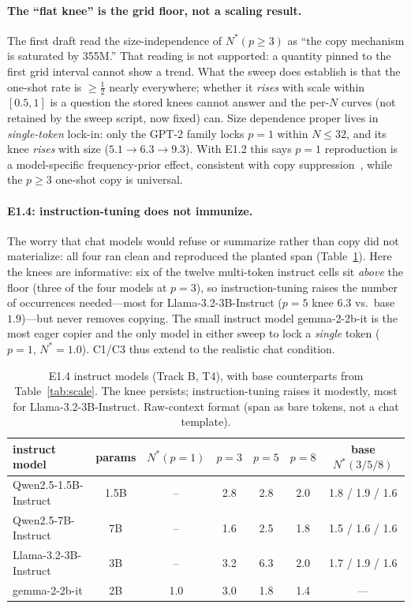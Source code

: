 \documentclass[11pt]{article}
\theoremstyle{plain}
\theoremstyle{definition}
\theoremstyle{remark}
\begin{document}
\paragraph{The ``flat knee'' is the grid floor, not a scaling result.} The first draft read the
size-independence of $N^*(p\ge3)$ as ``the copy mechanism is saturated by 355M.'' That reading
is not supported: a quantity pinned to the first grid interval cannot show a trend. What the
sweep does establish is that the one-shot rate is $\ge\tfrac12$ nearly everywhere; whether it
\emph{rises} with scale within $[0.5,1]$ is a question the stored knees cannot answer and the
per-$N$ curves (not retained by the sweep script, now fixed) can. Size dependence proper lives in
\emph{single-token} lock-in: only the GPT-2 family locks $p{=}1$ within $N\le32$, and its knee
\emph{rises} with size ($5.1\to6.3\to9.3$). With E1.2 this says $p{=}1$ reproduction is a
model-specific frequency-prior effect, consistent with copy suppression~\cite{mcdougall2023},
while the $p\ge3$ one-shot copy is universal.

\paragraph{E1.4: instruction-tuning does not immunize.} The worry that chat models would
refuse or summarize rather than copy did not materialize: all four ran clean and reproduced
the planted span (Table~\ref{tab:instruct}). Here the knees are informative: six of the twelve
multi-token instruct cells sit \emph{above} the floor (three of the four models at $p{=}3$),
so instruction-tuning raises the number of occurrences needed---most for Llama-3.2-3B-Instruct
($p{=}5$ knee $6.3$ vs.\ base $1.9$)---but never removes copying.
The small instruct model gemma-2-2b-it is the most eager copier and the only model in either
sweep to lock a \emph{single} token ($p{=}1$, $N^*{=}1.0$). C1/C3 thus extend to the realistic
chat condition.

\begin{table}[h]
\centering\small
\begin{tabular}{lcccccc}
\toprule
instruct model & params & $N^*(p{=}1)$ & $p{=}3$ & $p{=}5$ & $p{=}8$ & base $N^*(3/5/8)$ \\
\midrule
Qwen2.5-1.5B-Instruct & 1.5B & --  & 2.8 & 2.8 & 2.0 & 1.8 / 1.9 / 1.6 \\
Qwen2.5-7B-Instruct   & 7B   & --  & 1.6 & 2.5 & 1.8 & 1.5 / 1.6 / 1.6 \\
Llama-3.2-3B-Instruct & 3B   & --  & 3.2 & 6.3 & 2.0 & 1.7 / 1.9 / 1.6 \\
gemma-2-2b-it         & 2B   & 1.0 & 3.0 & 1.8 & 1.4 & --- \\
\bottomrule
\end{tabular}
\caption{E1.4 instruct models (Track B, T4), with base counterparts from
Table~\ref{tab:scale}. The knee persists; instruction-tuning raises it modestly, most for
Llama-3.2-3B-Instruct. Raw-context format (span as bare tokens, not a chat template).}
\label{tab:instruct}
\end{table}
\end{document}
